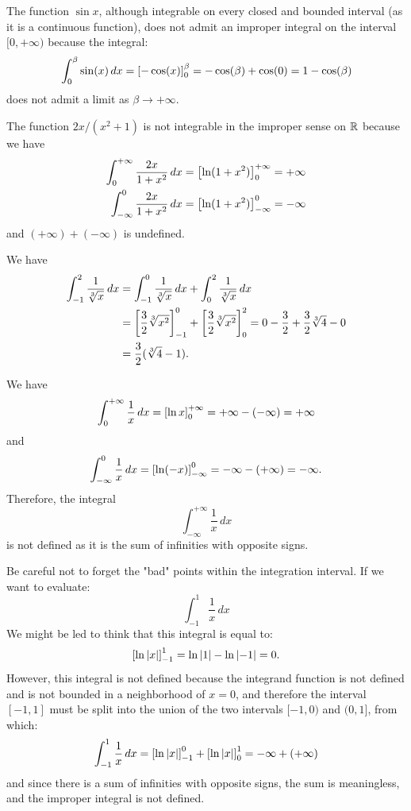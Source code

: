 \begin{example}
The function $\sin x$, although integrable on every closed and bounded interval
(as it is a continuous function), does not admit an improper integral on the
interval $[0,+\infty)$ because the integral:
\[
  \int_0^\beta \sin(x)\, dx
  = {\left[ -\cos(x) \right]}_0^\beta
  = -\cos(\beta)+\cos(0) = 1-\cos(\beta)
\]
does not admit a limit as $\beta\to +\infty$.
\end{example}

\begin{example}
The function $2x/(x^2+1)$ is not integrable in the improper sense on ${\mathbb R}$
because we have
\begin{align*}
\int_{0}^{+\infty} \frac {2x} {1+x^2}\, dx
 &= {\left[ \ln (1+x^2) \right]}_0^{+\infty} = +\infty \\
\int_{-\infty}^0 \frac{2x}{1+x^2}\, dx
 &= {\left[ \ln(1+x^2) \right]}_{-\infty}^0 = -\infty
\end{align*}
and $(+\infty)+ (-\infty)$ is undefined.
\end{example}

\begin{example}
We have
\begin{align*}
  \int_{-1}^2 \frac{1}{\sqrt[3]{x}}\, dx
  &= \int_{-1}^0 \frac{1}{\sqrt[3] {x}}\, dx
   + \int_{0}^2 \frac{1}{\sqrt[3] x}\, dx \\
    &= {\left[ \frac 3 2 \sqrt[3] {x^2} \right]}_{-1}^0  + {\left[ \frac 3 2 \sqrt[3]
  {x^2} \right]}_0^2
  = 0 - \frac 3 2 + \frac 3 2 \sqrt[3]{4} - 0 \\
  &= \frac 3 2 (\sqrt[3] 4-1).
\end{align*}
\end{example}

\begin{example}
We have
\[
  \int_0^{+\infty} \frac{1}{x}\, dx
  = {\left[ \ln x \right]}_0^{+\infty}
  = +\infty - (-\infty) = +\infty
\]
and
\[
  \int_{-\infty}^{0} \frac{1}{x}\, dx
  = {\left[ \ln(-x) \right]}_{-\infty}^{0}
  = -\infty - (+\infty) = -\infty.
\]
Therefore, the integral
\[
  \int_{-\infty}^{+\infty} \frac{1}{x}\, dx
\]
is not defined as it is the sum of infinities with opposite signs.
\end{example}

\begin{remark}
Be careful not to forget the "bad" points within the integration interval. If we
want to evaluate:
\[
  \int_{-1}^1 \frac{1}{x}\, dx
\]
We might be led to think that this integral is equal to:
\[
 {\left[ \ln {\left|x\right|} \right]}_{-1}^1 = \ln {\left|1\right|} - \ln {\left|-1\right|} = 0.
\]
However, this integral is not defined because the integrand function is not
defined and is not bounded in a neighborhood of $x=0$, and therefore the
interval $[-1,1]$ must be split into the union of the two intervals $[-1,0)$ and
$(0,1]$, from which:
\[
  \int_{-1}^1 \frac{1}{x}\, dx = {\left[ \ln {\left|x\right|} \right]}_{-1}^0 + {\left[ \ln{\left|x\right|} \right]}_0^{1}
   = -\infty + (+\infty)
\]
and since there is a sum of infinities with opposite signs, the sum is
meaningless, and the improper integral is not defined.
\end{remark}

